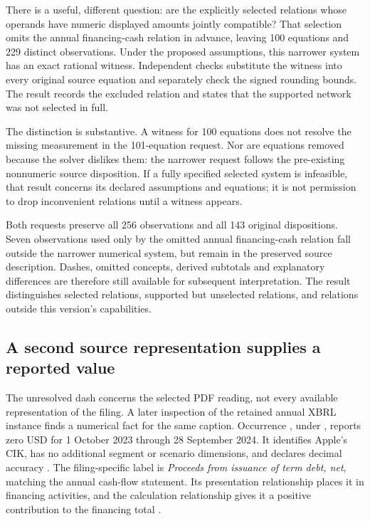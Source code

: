 There is a useful, different question: are the explicitly selected relations
whose operands have numeric displayed amounts jointly compatible? That selection
omits the annual financing-cash relation in advance, leaving 100 equations and
229 distinct observations. Under the proposed assumptions, this narrower system
has an exact rational witness. Independent checks substitute the witness into
every original source equation and separately check the signed rounding bounds.
The result records the excluded relation and states that the supported network
was not selected in full.

The distinction is substantive. A witness for 100 equations does not resolve
the missing measurement in the 101-equation request. Nor are equations removed
because the solver dislikes them: the narrower request follows the pre-existing
nonnumeric source disposition. If a fully specified selected system is
infeasible, that result concerns its declared assumptions and equations; it is
not permission to drop inconvenient relations until a witness appears.

Both requests preserve all 256 observations and all 143 original dispositions.
Seven observations used only by the omitted annual financing-cash relation
fall outside the narrower numerical system, but remain in the preserved source
description. Dashes, omitted concepts, derived subtotals and explanatory
differences are therefore still available for subsequent interpretation.
The result distinguishes selected relations, supported but unselected relations,
and relations outside this version's capabilities.

\subsection{A second source representation supplies a reported value}
\label{sec:debt-selected-reading}

The unresolved dash concerns the selected PDF reading, not every available
representation of the filing. A later inspection of the retained annual XBRL
instance finds a numerical fact for the same caption. Occurrence
, under , reports zero
USD for 1 October 2023 through 28 September 2024. It identifies Apple's CIK,
has no additional segment or scenario dimensions, and declares decimal
accuracy . The filing-specific label is \emph{Proceeds from issuance of
term debt, net}, matching the annual cash-flow statement. Its presentation
relationship places it in financing activities, and the calculation
relationship gives it a positive contribution to the financing total
\citep[retained instance, occurrence f-325, context c-1; associated label,
presentation and calculation relationships]{apple2024xbrlinstance}.

